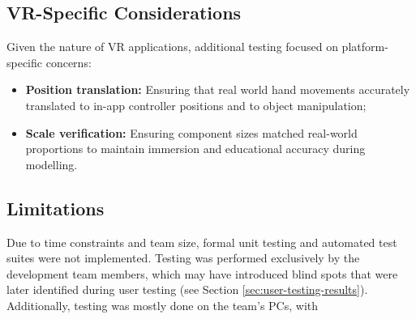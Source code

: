 \subsection{VR-Specific Considerations}

Given the nature of VR applications, additional testing focused on platform-specific concerns:

\begin{itemize}
    \item \textbf{Position translation:} Ensuring that real world hand movements accurately translated to in-app controller positions and to object manipulation;
    \item \textbf{Scale verification:} Ensuring component sizes matched real-world proportions to maintain immersion and educational accuracy during modelling.
\end{itemize}

\subsection{Limitations}

Due to time constraints and team size, formal unit testing and automated test suites were not implemented.
Testing was performed exclusively by the development team members, which may have introduced blind spots that were later identified during user testing (see Section \ref{sec:user-testing-results}).
Additionally, testing was mostly done on the team's PCs, with 